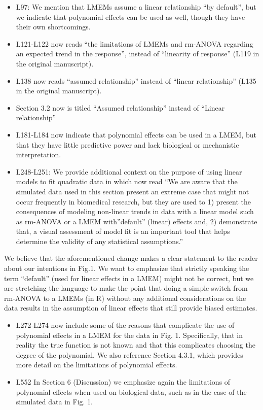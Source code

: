 \documentclass[
]{article}
\begin{document}
\begin{itemize}
\item
  L97: We mention that LMEMs assume a linear relationship ``by default'', but we indicate that polynomial effects can be used as well, though they have their own shortcomings.
\item
  L121-L122 now reads ``the limitations of LMEMs and rm-ANOVA regarding an expected trend in the response'', instead of ``linearity of response'' (L119 in the original manuscript).
\item
  L138 now reads ``assumed relationship'' instead of ``linear relationship'' (L135 in the original manuscript).
\item
  Section 3.2 now is titled ``Assumed relationship'' instead of ``Linear relationship''
\item
  L181-L184 now indicate that polynomial effects can be used in a LMEM, but that they have little predictive power and lack biological or mechanistic interpretation.
\item
  L248-L251: We provide additional context on the purpose of using linear models to fit quadratic data in which now read ``We are aware that the simulated data used in this section present an extreme case that might not occur frequently in biomedical research, but they are used to 1) present the consequences of modeling non-linear trends in data with a linear model such as rm-ANOVA or a LMEM with''default'' (linear) effects and, 2) demonstrate that, a visual assessment of model fit is an important tool that helps determine the validity of any statistical assumptions.''
\end{itemize}

We believe that the aforementioned change makes a clear statement to the reader about our intentions in Fig.1. We want to emphasize that strictly speaking the term ``default'' (used for linear effects in a LMEM) might not be correct, but we are stretching the language to make the point that doing a simple switch from rm-ANOVA to a LMEMs (in R) without any additional considerations on the data results in the assumption of linear effects that still provide biased estimates.

\begin{itemize}
\item
  L272-L274 now include some of the reasons that complicate the use of polynomial effects in a LMEM for the data in Fig. 1. Specifically, that in reality the true function is not known and that this complicates choosing the degree of the polynomial. We also reference Section 4.3.1, which provides more detail on the limitations of polynomial effects.
\item
  L552 In Section 6 (Discussion) we emphasize again the limitations of polynomial effects when used on biological data, such as in the case of the simulated data in Fig. 1.
\end{itemize}
\end{document}
